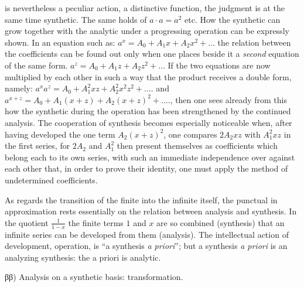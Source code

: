 \documentclass[12pt,a4paper,openany]{book}
\newcommand{\opage}[1]{\marginnote{\footnotesize\textit{[#1]}}}
\begin{document}
\setcounter{footnote}{0}%
\opage{42}is nevertheless a peculiar action, a distinctive function, the judgment is at the same time synthetic. The same holds of
\setcounter{footnote}{0}%
\opage{43}$a\cdot a=a^{2}$ etc. How the synthetic can grow together with the analytic under a progressing operation can be expressly shown. In an equation such as: $a^{x}=A_{0}+A_{1}x+A_{2}x^{2}+\ldots$ the relation between the coefficients can be
\setcounter{footnote}{0}%
\opage{44}found out only when one places beside it a \emph{second} equation of the same form. $a^{z}=A_{0}+A_{1}z+A_{2}z^{2}+\ldots$ If the two equations are now multiplied by each other in such a way that the product receives a double form, namely: $a^{x}a^{z}=A_{0}+A_{1}^{2}xz+A_{2}^{2}x^{2}z^{2}+\ldots.$ and $a^{x+z}=A_{0}+A_{1}(x+z)+A_{2}(x+z)^{2}+\ldots.$, then one sees already from this how the synthetic during the operation has been strengthened by the continued analysis. The cooperation of synthesis becomes especially noticeable when, after having developed the one term $A_{2}(x+z)^{2}$, one compares $2A_{2}xz$ with $A_{1}^{2}xz$ in the first series, for $2A_{2}$ and $A_{1}^{2}$ then present themselves as coefficients which belong each to its own series, with such an immediate independence over against each other that, in order to prove their identity, one must apply the method of undetermined coefficients.

As regards the transition of the finite into the infinite itself, the punctual in approximation rests essentially on the relation between analysis and synthesis. In the quotient $\frac{1}{1-x}$ the finite terms $1$ and $x$ are so combined (synthesis) that an infinite series can be developed from them (analysis). The intellectual action of development, operation, is ``a synthesis \textit{a priori}''; but a synthesis \textit{a priori} is an analyzing synthesis: the a priori is analytic.

\begin{center}ββ) Analysis on a synthetic basis: transformation.\end{center}
\end{document}
